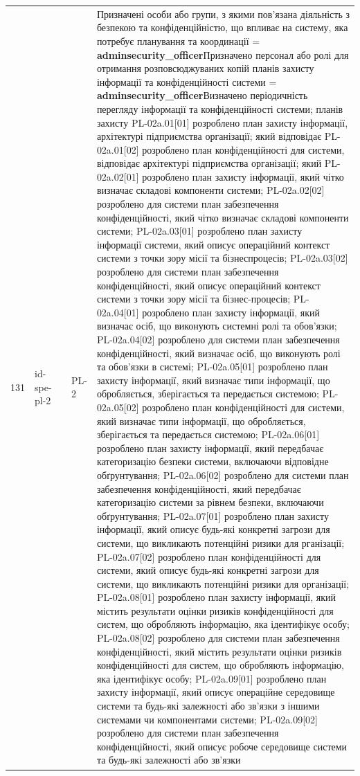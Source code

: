 \documentclass[10pt]{article}
\begin{document}
\begin{longtable}{|c|>{\raggedright\arraybackslash}p{4cm}|>{\raggedright\arraybackslash}p{2.5cm}|>{\raggedright\arraybackslash}p{3.5cm}|>{\raggedright\arraybackslash}p{5.5cm}|}
131 & id-spe-pl-2 &  & PL-2 & Призначені особи або групи, з якими пов'язана діяльність з безпекою та конфіденційністю, що впливає на систему, яка потребує планування та координації = \textbf{adminsecurity\_\allowbreak{}officer}\newline Призначено персонал або ролі для отримання розповсюджуваних копій планів захисту інформації та конфіденційності системи = \textbf{adminsecurity\_\allowbreak{}officer}\newline Визначено періодичність перегляду інформації та конфіденційності системи; планів захисту PL-02a.01[01] розроблено план захисту інформації, архітектурі підприємства організації; який відповідає PL-02a.01[02] розроблено план конфіденційності для системи, відповідає архітектурі підприємства організації; який PL-02a.02[01] розроблено план захисту інформації, який чітко визначає складові компоненти системи; PL-02a.02[02] розроблено для системи план забезпечення конфіденційності, який чітко визначає складові компоненти системи; PL-02a.03[01] розроблено план захисту інформації системи, який описує операційний контекст системи з точки зору місії та бізнеспроцесів; PL-02a.03[02] розроблено для системи план забезпечення конфіденційності, який описує операційний контекст системи з точки зору місії та бізнес-процесів; PL-02a.04[01] розроблено план захисту інформації, який визначає осіб, що виконують системні ролі та обов'язки; PL-02a.04[02] розроблено для системи план забезпечення конфіденційності, який визначає осіб, що виконують ролі та обов'язки в системі; PL-02a.05[01] розроблено план захисту інформації, який визначає типи інформації, що обробляється, зберігається та передається системою; PL-02a.05[02] розроблено план конфіденційності для системи, який визначає типи інформації, що обробляється, зберігається та передається системою; PL-02a.06[01] розроблено план захисту інформації, який передбачає категоризацію безпеки системи, включаючи відповідне обґрунтування; PL-02a.06[02] розроблено для системи план забезпечення конфіденційності, який передбачає категоризацію системи за рівнем безпеки, включаючи обґрунтування; PL-02a.07[01] розроблено план захисту інформації, який описує будь-які конкретні загрози для системи, що викликають потенційні ризики для рганізації; PL-02a.07[02] розроблено план конфіденційності для системи, який описує будь-які конкретні загрози для системи, що викликають потенційні ризики для організації; PL-02a.08[01] розроблено план захисту інформації, який містить результати оцінки ризиків конфіденційності для систем, що обробляють інформацію, яка ідентифікує особу; PL-02a.08[02] розроблено для системи план забезпечення конфіденційності, який містить результати оцінки ризиків конфіденційності для систем, що обробляють інформацію, яка ідентифікує особу; PL-02a.09[01] розроблено план захисту інформації, який описує операційне середовище системи та будь-які залежності або зв'язки з іншими системами чи компонентами системи; PL-02a.09[02] розроблено для системи план забезпечення конфіденційності, який описує робоче середовище системи та будь-які залежності або зв'язки 
\end{longtable}
\end{document}
